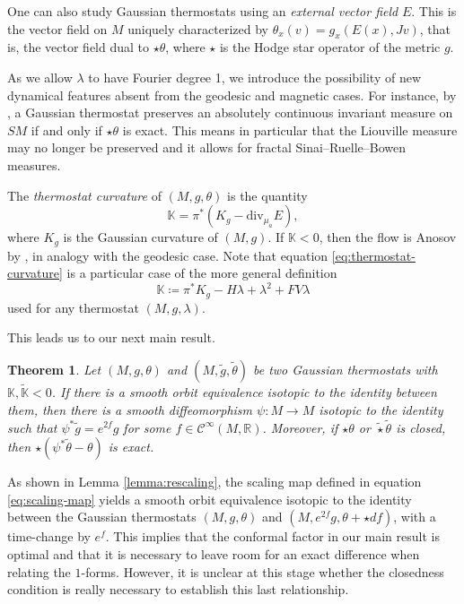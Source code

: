 \documentclass[reqno,12pt,letterpaper]{amsart}
\newtheorem{theorem}[proposition]{Theorem}
\theoremstyle{definition}
\theoremstyle{remark}
\theoremstyle{definition}
\numberwithin{equation}{section}
\newcommand{\R}{\mathbb{R}}
\renewcommand{\div}{\mathrm{div}}
\begin{document}
One can also study Gaussian thermostats using  an \textit{external vector field} $E$. This is the vector field on $M$ uniquely characterized by $\theta_x(v)=g_x(E(x),Jv)$, that is, the vector field dual to $\star \theta$, where $\star$ is the Hodge star operator of the metric $g$.

As we allow $\lambda$ to have Fourier degree 1, we introduce the possibility of new dynamical features absent from the geodesic and magnetic cases. For instance, by \cite[Theorem A]{dairbekov07}, a Gaussian thermostat preserves an absolutely continuous invariant measure on $SM$ if and only if $\star\theta$ is exact. This means in particular that the Liouville measure may no longer be preserved and it allows for fractal Sinai--Ruelle--Bowen measures.

The \textit{thermostat curvature} of $(M, g, \theta)$ is the quantity
\begin{equation}\label{eq:thermostat-curvature}
\mathbb{K}= \pi^*(K_g -\div_{\mu_a} E),
\end{equation}
where $K_g$ is the Gaussian curvature of $(M, g)$. If $\mathbb{K}<0$, then the flow is Anosov by \cite[Theorem 5.2]{wojtkowski00b}, in analogy with the geodesic case. Note that equation \eqref{eq:thermostat-curvature} is a particular case of the more general definition
\begin{equation}\label{eq:general-thermostat-curvature}
\mathbb{K}\coloneqq\pi^*K_g -H\lambda+\lambda^2+FV\lambda
\end{equation}
used for any thermostat $(M, g, \lambda)$.

This leads us to our next main result.
\begin{theorem}\label{theorem:main-theorem}  %
Let $(M, g, \theta)$ and $(M, \tilde{g}, \tilde{\theta})$ be two Gaussian thermostats with $\mathbb{K},\widetilde{\mathbb{K}}<0$. If there is a smooth orbit equivalence isotopic to the identity between them, then there is a smooth diffeomorphism $\psi : M\to M$ isotopic to the identity such that $\psi^*\tilde{g}=e^{2f}g$ for some $f\in \mathcal{C}^\infty(M, \R)$. Moreover, if $\star\theta$ or $\tilde{\star}\tilde{\theta}$ is closed, then $\star (\psi^*\tilde{\theta}-\theta)$ is exact.
\end{theorem}

As shown in Lemma \ref{lemma:rescaling}, the scaling map defined in equation \eqref{eq:scaling-map} yields a smooth orbit equivalence isotopic to the identity between the Gaussian thermostats
$(M, g, \theta)$ and $(M, e^{2f}g, \theta+\star df)$, with a time-change by $e^f$. This implies that the conformal factor in our main result is optimal and that it is necessary to leave room for an exact difference when relating the $1$-forms. However, it is unclear at this stage whether the closedness condition is really necessary to establish this last relationship.
\end{document}
